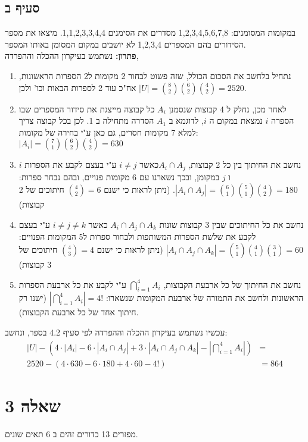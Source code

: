 \documentclass{article}
\begin{document}
	\subsection*{סעיף ב}
	במקומות המסומנים: 1,2,3,4,5,6,7,8 מסדרים את הסימנים 1,1,2,3,3,4,4.
	מיצאו את מספר הסידורים בהם המספרים 1,2,3,4 לא יושבים במקום המסומן באותו המספר. \\
	\textbf{פתרון:}
	נשתמש בעיקרון ההכלה וההפרדה,
	\begin{enumerate}
		\item נתחיל בלחשב את הסכום הכולל, שזה פשוט לבחור 2 מקומות ל2 הספרות הראשונות, אח"כ עוד 2 לספרות הבאות וכו'
		ולכן $|U| = {8 \choose 2}{6 \choose 2}{4 \choose 2} = 2520$.
		\item לאחר מכן, נחלק ל 4 קבוצות שנסמנן $A_i$ כל קבוצה מייצגת את סידור המספרים שבו הספרה $i$ נמצאת במקום ה $i$, לדוגמא ב $A_1$ הסדרה מתחילה ב 1.
		לכן בכל קבוצה צריך למלא 7 מקומות חסרים, גם כאן ע"י בחירה של מקומות:
		$|A_i| = {7 \choose 1}{6 \choose 2}{4 \choose 2} = 630$
		\item נחשב את החיתוך בין כל 2 קבוצות, $A_i \cap A_j$כאשר $i \neq j$ ע"י בעצם לקבע את הספרות $i$ ו $j$ במקומן, ובכך נשארנו עם 6 מקומות פנויים, ובהם נבחר ספרות:
		$|A_i \cap A_j| = {6 \choose 1}{5 \choose 1}{4 \choose 2} = 180$. (ניתן לראות כי ישנם ${4 \choose 2} = 6$ חיתוכים של 2 קבוצות)
		\item נחשב את כל החיתוכים שבין 3 קבוצות שונות $A_i \cap A_j \cap A_k$ כאשר $i \neq j \neq k$ ע"י בעצם לקבע את שלשת הספרות המשותפות ולבחור ספרות ל5 המקומות הפנויים:
		$|A_i \cap A_j \cap A_k| = {5 \choose 1}{4 \choose 1}{3 \choose 1} = 60$ (ניתן לראות כי ישנם ${4 \choose 3} = 4$ חיתוכים של 3 קבוצות)
		\item נחשב את החיתוך של כל ארבעת הקבוצות, $\bigcap_{i=1}^4 A_i$ ע"י לקבע את כל ארבעת הספרות הראשונות ולחשב את התמורה של ארבעת המקומות שנשארו:
		$|\bigcap_{i=1}^4 A_i| = 4!$ (ישנו רק חיתוך אחד של כל ארבעת הקבוצות).
	\end{enumerate}
	עכשיו נשתמש בעיקרון ההכלה וההפרדה לפי סעיף 4.2 בספר, ונחשב:
	\begin{align*}
		|U| - (4 \cdot |A_i| - 6 \cdot |A_i \cap A_j| + 3 \cdot |A_i \cap A_j \cap A_k| - |\bigcap_{i=1}^4 A_i|) &= \\
		2520 - (4 \cdot 630 - 6 \cdot 180 + 4 \cdot 60 - 4!) &= 864
	\end{align*}

	\pagebreak
	\section*{שאלה 3}
	מפזרים 13 כדורים זהים ב 6 תאים שונים.
\end{document}
